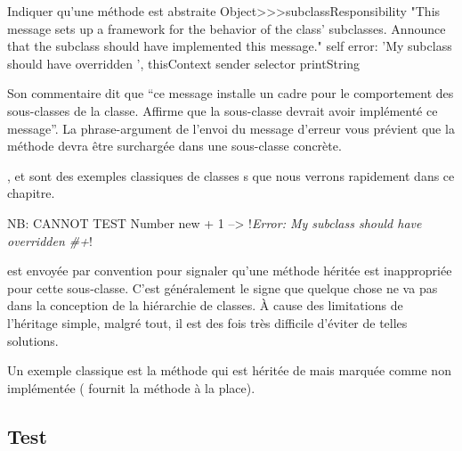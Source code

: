 \documentclass[a4paper,10pt,twoside]{book}
\begin{document}
\begin{method}{Indiquer qu'une m\'ethode est abstraite}
Object>>>subclassResponsibility
    "This message sets up a framework for the behavior of the class' subclasses.
    Announce that the subclass should have implemented this message."
    self error: 'My subclass should have overridden ', thisContext sender selector printString
\end{method}

Son commentaire dit que ``ce message installe un cadre pour le
comportement des sous-classes de la classe. Affirme que la sous-classe
devrait avoir impl\'ement\'e ce message''. La phrase-argument de
l'envoi du message d'erreur  vous pr\'evient que la
m\'ethode devra \^etre surcharg\'ee dans une sous-classe concr\`ete.

,  et  sont des exemples classiques de  classes s que nous verrons rapidement dans ce chapitre.

\begin{code}{NB: CANNOT TEST}
Number new + 1 --> !\emph{Error: My subclass should have overridden \#+}!
\end{code}

 est envoy\'ee par convention pour signaler qu'une m\'ethode h\'erit\'ee est inappropri\'ee pour cette sous-classe. C'est g\'en\'eralement le signe que quelque chose ne va pas dans la conception de la hi\'erarchie de classes. \`A cause des limitations de l'h\'eritage simple, malgr\'e tout, il est des fois tr\`es difficile d'\'eviter de telles solutions.

Un exemple classique est la m\'ethode  qui est h\'erit\'ee de  mais marqu\'ee comme non impl\'ement\'ee ( fournit la m\'ethode  \`a la place).



\subsection{Test}
\end{document}
